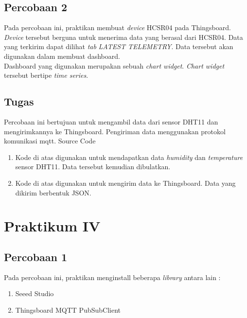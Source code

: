 \documentclass{class}
\begin{document}
    \subsection{Percobaan 2}
    Pada percobaan ini, praktikan membuat \emph{device} HCSR04 pada Thingsboard.
    \emph{Device} tersebut berguna untuk menerima data yang berasal dari HCSR04. 
    Data yang terkirim dapat dilihat \emph{tab} \emph{LATEST TELEMETRY}.
    Data tersebut akan digunakan dalam membuat dashboard. \\
    Dashboard yang digunakan merupakan sebuah \emph{chart widget}.
    \emph{Chart widget} tersebut bertipe \emph{time series}.
    \subsection{Tugas}
    Percobaan ini bertujuan untuk mengambil data dari sensor DHT11 dan mengirimkannya ke Thingsboard. 
    Pengiriman data menggunakan protokol komunikasi mqtt. 
    Source Code
    \begin{enumerate}
      \item 
      Kode di atas digunakan untuk mendapatkan data \emph{humidity} dan \emph{temperature} sensor DHT11.
      Data tersebut kemudian dibulatkan.
      \item 
      Kode di atas digunakan untuk mengirim data ke Thingsboard.
      Data yang dikirim berbentuk JSON. \\
    \end{enumerate}
  \section{Praktikum IV}
  \subsection{Percobaan 1}
  Pada percobaan ini, praktikan menginstall beberapa \emph{library} antara lain :
  \begin{enumerate}
    \item Seeed Studio
    \item Thingsboard MQTT PubSubClient
  \end{enumerate}
\end{document}
